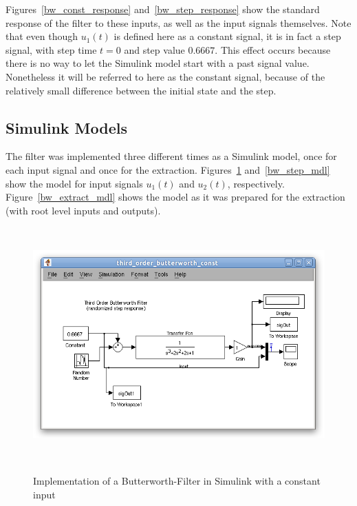 Figures~\ref{bw_const_response} and~\ref{bw_step_response} show the standard response of the filter to these inputs, as well as the input signals themselves. Note that even though $u_1(t)$ is defined here as a constant signal, it is in fact a step signal, with step time $t=0$ and step value $0.6667$. This effect occurs because there is no way to let the Simulink model start with a past signal value. Nonetheless it will be referred to here as the constant signal, because of the relatively small difference between the initial state and the step.

\subsection{Simulink Models}
\label{eval_sim_models}

The filter was implemented three different times as a Simulink model, once for each input signal and once for the extraction. Figures~\ref{bw_const_mdl} and~\ref{bw_step_mdl} show the model for input signals $u_1(t)$ and $u_2(t)$, respectively. Figure~\ref{bw_extract_mdl} shows the model as it was prepared for the extraction (with root level inputs and outputs).

\begin{figure}
\begin{center}
\includegraphics[height=9cm]{media/bw/bw_const_mdl}\\
\end{center}
\caption{Implementation of a Butterworth-Filter in Simulink with a constant input}
\label{bw_const_mdl}
\end{figure}

